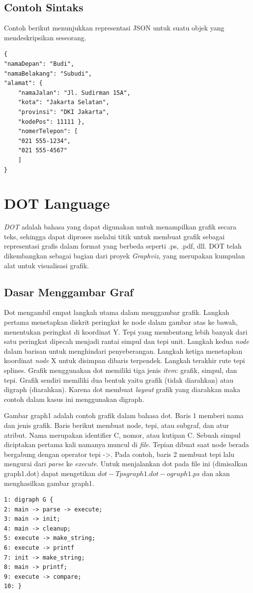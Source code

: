 \subsection{Contoh Sintaks}
\label{sec: Contoh Sintaks}
Contoh berikut menunjukkan representasi JSON untuk suatu objek yang mendeskripsikan seseorang.
\begin{lstlisting}
{ 
"namaDepan": "Budi", 
"namaBelakang": "Subudi", 
"alamat": { 
	"namaJalan": "Jl. Sudirman 15A", 
	"kota": "Jakarta Selatan", 
	"provinsi": "DKI Jakarta", 
	"kodePos": 11111 }, 
	"nomerTelepon": [ 
	"021 555-1234", 
	"021 555-4567" 
	] 
}
\end{lstlisting}




\section{DOT Language}
\label{sec: DOT Language}
\textit{DOT} adalah bahasa yang dapat digunakan untuk menampilkan grafik secara teks, sehingga dapat diproses melalui titik untuk membuat grafik sebagai representasi grafis dalam format yang berbeda seperti .ps, .pdf, dll. DOT telah dikembangkan sebagai bagian dari proyek \textit{Graphviz}, yang merupakan kumpulan alat untuk visualisasi grafik. 

\subsection{Dasar Menggambar Graf}
\label{sec: Dasar Menggambar Graf}
Dot mengambil empat langkah utama dalam menggambar grafik. Langkah pertama menetapkan diskrit peringkat ke node dalam gambar atas ke bawah, menentukan peringkat di koordinat Y. Tepi yang membentang lebih banyak dari satu peringkat dipecah menjadi rantai simpul dan tepi unit. Langkah kedua \textit{node} dalam barisan untuk menghindari penyeberangan. Langkah ketiga menetapkan koordinat \textit{node} X untuk disimpan dibaris terpendek. Langkah terakhir rute tepi splines. Grafik menggunakan dot memiliki tiga jenis \textit{item}: grafik, simpul, dan tepi. Grafik sendiri memiliki dua bentuk yaitu grafik (tidak diarahkan) atau digraph (diarahkan). Karena dot membuat \textit{layout} grafik yang diarahkan maka contoh dalam kasus ini menggunakan digraph. 

Gambar graph1 adalah contoh grafik dalam bahasa dot. Baris 1 memberi nama dan jenis grafik. Baris berikut membuat node, tepi, atau subgraf, dan atur atribut. Nama merupakan identifier C, nomor, atau kutipan C. Sebuah simpul diciptakan pertama kali namanya muncul di \textit{file}. Tepian dibuat saat node berada bergabung dengan operator tepi ->. Pada contoh, baris 2 membuat tepi lalu mengurai dari \textit{parse} ke \textit{execute}. Untuk menjalankan dot pada file ini (dimisalkan graph1.dot) dapat mengetikan $ dot -Tps graph1.dot -o graph1.ps $ dan akan menghasilkan gambar graph1. 
\begin{lstlisting}
1: digraph G {
2: main -> parse -> execute;
3: main -> init;
4: main -> cleanup;
5: execute -> make_string;
6: execute -> printf
7: init -> make_string;
8: main -> printf;
9: execute -> compare;
10: }
\end{lstlisting}

